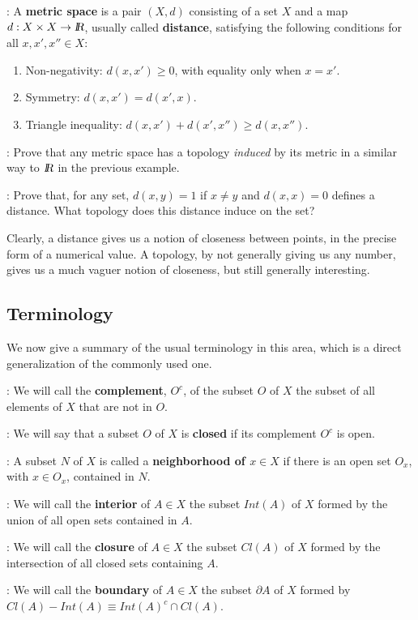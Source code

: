 : A {\bf metric space} is a pair $(X,d)$ consisting of a set $X$ and a map $d: X \times X \to \mbox{\sl {l$\!\!\!\;\:\!$R}}$, usually called \textbf{distance}, satisfying the following conditions for all $x, x', x'' \in X$:

\begin{enumerate} \item Non-negativity: $d(x,x') \geq 0$, with equality only when $x = x'$. \item Symmetry: $d(x,x')=d(x',x)$. \item Triangle inequality: $d(x,x') +d(x',x'') \geq d(x,x'')$. \end{enumerate}

\ejer: Prove that any metric space has a topology {\it induced} by its metric in a similar way to $\mbox{\sl {l$\!\!\!\;\:\!$R}}$ in the previous example.

\ejer: Prove that, for any set, $d(x,y)=1$ if $x\neq y$ and $d(x,x)=0$ defines a distance. What topology does this distance induce on the set?

Clearly, a distance gives us a notion of closeness between points, in the precise form of a numerical value. A topology, by not generally giving us any number, gives us a much vaguer notion of closeness, but still generally interesting.

\subsection{Terminology}

We now give a summary of the usual terminology in this area, which is a direct generalization of the commonly used one.

: We will call the {\bf complement}, $O^c$, of the subset $O$ of $X$ the subset of all elements of $X$ that are not in $O$.

: We will say that a subset $O$ of $X$ is {\bf closed} if its complement $O^c$ is open.

: A subset $N$ of $X$ is called a {\bf neighborhood of $x \in X$} if there is an open set $O_x$, with $x \in O_x$, contained in $N$.

: We will call the {\bf interior} of $A \in X$ the subset $Int(A)$ of $X$ formed by the union of all open sets contained in $A$.

: We will call the {\bf closure} of $A \in X$ the subset $Cl(A)$ of $X$ formed by the intersection of all closed sets containing $A$.

: We will call the {\bf boundary} of $A \in X$ the subset $\partial A$ of $X$ formed by $Cl(A) - Int(A) \equiv Int(A)^c \cap Cl(A)$.

